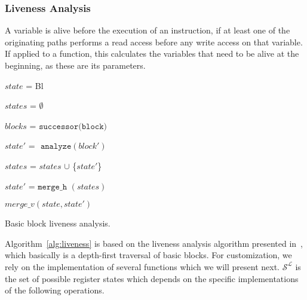 \subsubsection{Liveness Analysis}
A variable is alive before the execution of an instruction, if at least one of the originating paths performs a read access before any write access on that variable. 
If applied to a function, this calculates the variables that need to be alive at the beginning, as these are its parameters. 

\begin{algorithm}[h!]
        \footnotesize
 	\SetAlgoLined
        \BlankLine
	{
 	$state$ = Bl 
 	

	$states$ = $\emptyset$                                                 
	
	$blocks$ = $\texttt{successor(block)}$                                   
	
	 {
	
 		$state'$ = $\texttt{ analyze}(block')$   
 		
		$states$ = $states$ $\cup$ \{$state'$\}  
	}

	$state'$ = $\texttt{merge\_h }(states)$   

	\Return $merge\_v(state, state')$  

	}
\caption{Basic block liveness analysis.}
\label{alg:liveness}
\end{algorithm}
Algorithm~\ref{alg:liveness} is based on the liveness analysis algorithm presented in~\cite{khedker2009data}, which basically is a depth-first traversal of basic blocks. 
For customization, we rely on the implementation of several functions which we will present next. $\mathcal{S}^\mathcal{L}$ is the set of possible register states which depends on the specific 
implementations of the following operations.

